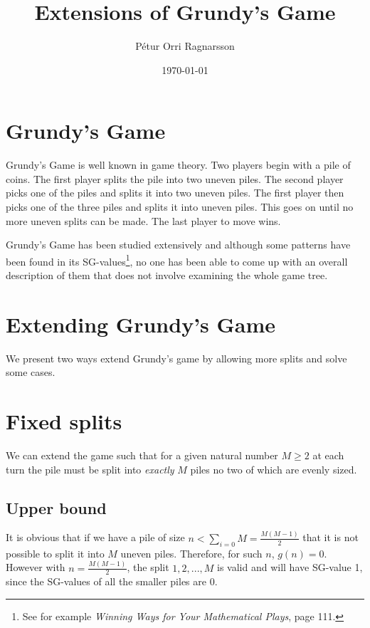 \documentclass[english,a4paper,twoside]{amsart}
\theoremstyle{definition}
\begin{document}
\title[exesefsfe]{Extensions of Grundy's Game}

\author{Pétur Orri Ragnarsson}

\date{\today}

\maketitle

\thispagestyle{empty}

\section{Grundy's Game}
Grundy's Game is well known in game theory. Two players begin with a pile of coins.
The first player splits the pile into two uneven piles. The second player picks one of the
piles and splits it into two uneven piles. The first player then picks one of the three piles
and splits it into uneven piles. This goes on until no more uneven splits can be made. The
last player to move wins.

Grundy's Game has been studied extensively and although some patterns have been found
in its SG-values\footnote{See for example \emph{Winning Ways for Your Mathematical Plays}, page 111.},
no one has been able to come up with an overall description of them
that does not involve examining the whole game tree.

\section{Extending Grundy's Game}
We present two ways extend Grundy's game by allowing more splits and solve some cases.

\section{Fixed splits}
We can extend the game such that for a given natural number $M \geq 2$ at each turn the
pile must be split into \emph{exactly} $M$ piles no two of which are evenly sized.

\subsection{Upper bound}
It is obvious that if we have a pile of size $n < \sum_{i=0}{M} = \frac{M(M-1)}{2}$ that it is
not possible to split it into $M$ uneven piles. Therefore, for such $n$, $g(n) = 0$.
However with $n = \frac{M(M-1)}{2}$, the split $1, 2, ..., M$ is valid and will have SG-value 1,
since the SG-values of all the smaller piles are 0.
\end{document}
